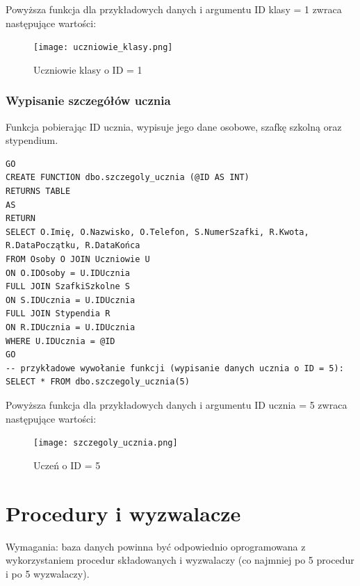 \documentclass[60pt]{article}
\begin{document}
Powyższa funkcja dla przykładowych danych i argumentu ID klasy = 1 zwraca następujące wartości:

\begin{figure}[h]
  \texttt{[image: uczniowie\_klasy.png]}
  \caption{Uczniowie klasy o ID = 1}
  \label{Uczniowie klasy o ID = 1}
\end{figure}

\subsubsection{Wypisanie szczegółów ucznia}

Funkcja pobierając ID ucznia, wypisuje jego dane osobowe, szafkę szkolną oraz stypendium. 

\begin{verbatim}
GO
CREATE FUNCTION dbo.szczegoly_ucznia (@ID AS INT)
RETURNS TABLE
AS
RETURN
SELECT O.Imię, O.Nazwisko, O.Telefon, S.NumerSzafki, R.Kwota, R.DataPoczątku, R.DataKońca
FROM Osoby O JOIN Uczniowie U
ON O.IDOsoby = U.IDUcznia
FULL JOIN SzafkiSzkolne S
ON S.IDUcznia = U.IDUcznia
FULL JOIN Stypendia R
ON R.IDUcznia = U.IDUcznia
WHERE U.IDUcznia = @ID
GO
-- przykładowe wywołanie funkcji (wypisanie danych ucznia o ID = 5):
SELECT * FROM dbo.szczegoly_ucznia(5)
\end{verbatim}

Powyższa funkcja dla przykładowych danych i argumentu ID ucznia = 5 zwraca następujące wartości:

\begin{figure}[h]
  \texttt{[image: szczegoly\_ucznia.png]}
  \caption{Uczeń o ID = 5}
  \label{Uczeń o ID = 5}
\end{figure}


\newpage

\section{Procedury i wyzwalacze}

Wymagania: baza danych powinna być odpowiednio oprogramowana z wykorzystaniem procedur składowanych i wyzwalaczy (co najmniej po 5 procedur i po 5 wyzwalaczy).
\end{document}

